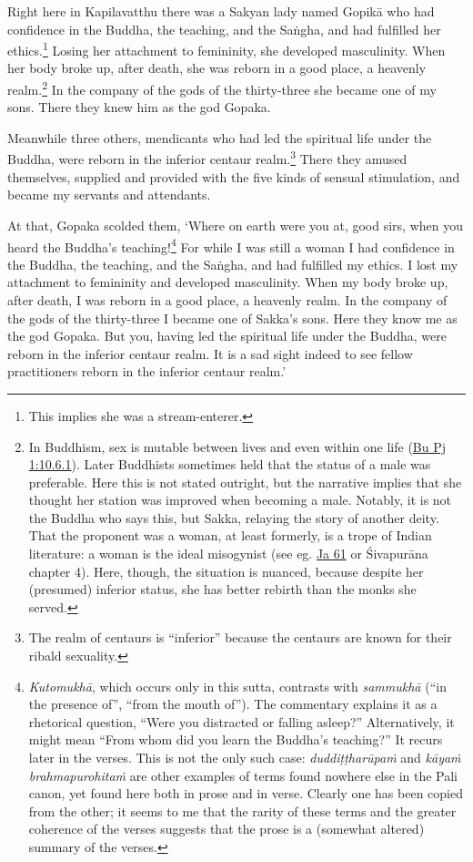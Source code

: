\documentclass[12pt,openany]{book}%
\begin{document}
Right here in Kapilavatthu there was a Sakyan lady named \textsanskrit{Gopikā} who had confidence in the Buddha, the teaching, and the \textsanskrit{Saṅgha}, and had fulfilled her ethics.\footnote{This implies she was a stream-enterer. } Losing her attachment to femininity, she developed masculinity. When her body broke up, after death, she was reborn in a good place, a heavenly realm.\footnote{In Buddhism, sex is mutable between lives and even within one life (\href{https://suttacentral.net/pli-tv-bu-vb-pj1/en/sujato\#10.6.1}{Bu Pj 1:10.6.1}). Later Buddhists sometimes held that the status of a male was preferable. Here this is not stated outright, but the narrative implies that she thought her station was improved when becoming a male. Notably, it is not the Buddha who says this, but Sakka, relaying the story of another deity. That the proponent was a woman, at least formerly, is a trope of Indian literature: a woman is the ideal misogynist (see eg. \href{https://suttacentral.net/ja61/en/sujato}{Ja 61} or \textsanskrit{Śivapurāna} chapter 4). Here, though, the situation is nuanced, because despite her (presumed) inferior status, she has better rebirth than the monks she served. } In the company of the gods of the thirty-three she became one of my sons. There they knew him as the god Gopaka. 

Meanwhile three others, mendicants who had led the spiritual life under the Buddha, were reborn in the inferior centaur realm.\footnote{The realm of centaurs is “inferior” because the centaurs are known for their ribald sexuality. } There they amused themselves, supplied and provided with the five kinds of sensual stimulation, and became my servants and attendants. 

At that, Gopaka scolded them, ‘Where on earth were you at, good sirs, when you heard the Buddha’s teaching!\footnote{\textit{\textsanskrit{Kutomukhā}}, which occurs only in this sutta, contrasts with \textit{\textsanskrit{sammukhā}} (“in the presence of”, “from the mouth of”). The commentary explains it as a rhetorical question, “Were you distracted or falling asleep?” Alternatively, it might mean “From whom did you learn the Buddha’s teaching?” It recurs later in the verses. This is not the only such case: \textit{\textsanskrit{duddiṭṭharūpaṁ}} and \textit{\textsanskrit{kāyaṁ} \textsanskrit{brahmapurohitaṁ}} are other examples of terms found nowhere else in the Pali canon, yet found here both in prose and in verse. Clearly one has been copied from the other; it seems to me that the rarity of these terms and the greater coherence of the verses suggests that the prose is a (somewhat altered) summary of the verses. } For while I was still a woman I had confidence in the Buddha, the teaching, and the \textsanskrit{Saṅgha}, and had fulfilled my ethics. I lost my attachment to femininity and developed masculinity. When my body broke up, after death, I was reborn in a good place, a heavenly realm. In the company of the gods of the thirty-three I became one of Sakka’s sons. Here they know me as the god Gopaka. But you, having led the spiritual life under the Buddha, were reborn in the inferior centaur realm. It is a sad sight indeed to see fellow practitioners reborn in the inferior centaur realm.’ 
\end{document}
